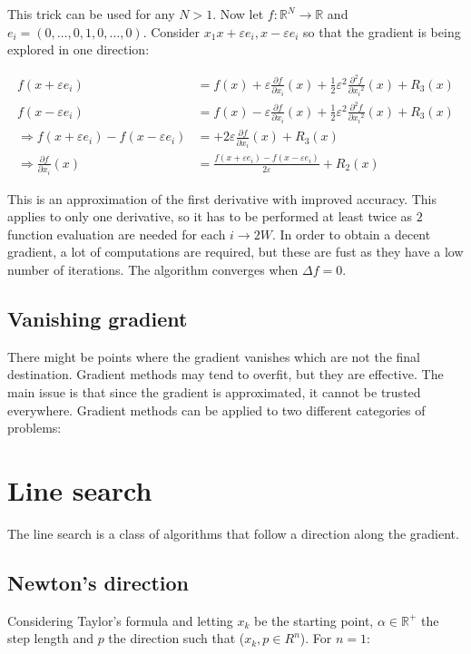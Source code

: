 This trick can be used for any $N>1$.
Now let $f: \mathbb{R}^N \rightarrow \mathbb{R}$ and $e_i=(0, \ldots, 0,1,0,\ldots,0)$.
Consider $x_1 x+\varepsilon e_i, x-\varepsilon e_i$ so that the gradient is being explored in one direction:

\begin{align*}
  f\left(x+\varepsilon e_i\right)&=f(x)+\varepsilon \frac{\partial f}{\partial x_i}(x)+\frac{1}{2} \varepsilon^2 \frac{\partial^2 f}{\partial x_i{ }^2}(x)+R_3(x) \\
  f\left(x-\varepsilon e_i\right)&=f(x)-\varepsilon \frac{\partial f}{\partial x_i}(x)+\frac{1}{2} \varepsilon^2 \frac{\partial^2 f}{\partial x_i{ }^2}(x)+R_3(x) \\
  \Rightarrow f\left(x+\varepsilon e_i\right)-f\left(x-\varepsilon e_i\right)&=+2 \varepsilon \frac{\partial f}{\partial x_i}(x)+R_3(x) \\
  \Rightarrow \frac{\partial f}{\partial x_i}(x)&=\frac{f\left(x+\varepsilon e_i\right)-f\left(x-\varepsilon e_i\right)}{2 \varepsilon}+R_2(x)
\end{align*}

This is an approximation of the first derivative with improved accuracy.
This applies to only one derivative, so it has to be performed at least twice as $2$ function evaluation are needed for each $i\rightarrow 2W$.
In order to obtain a decent gradient, a lot of computations are required, but these are fust as they have a low number of iterations.
The algorithm converges when $\Delta f = 0$.

  \subsection{Vanishing gradient}
  There might be points where the gradient vanishes which are not the final destination.
  Gradient methods may tend to overfit, but they are effective.
  The main issue is that since the gradient is approximated, it cannot be trusted everywhere.
Gradient methods can be applied to two different categories of problems:

\section{Line search}
The line search is a class of algorithms that follow a direction along the gradient.


  \subsection{Newton's direction}
  Considering Taylor's formula and letting $x_k$ be the starting point, $\alpha \in \mathbb{R}^+$ the step length and $p$ the direction such that ($x_k, p \in R^n$).
  For $n=1$:

